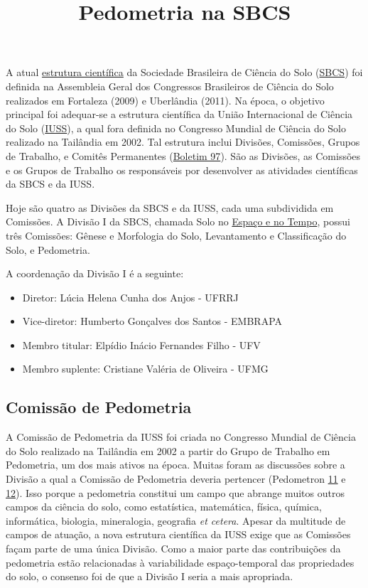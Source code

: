 \title{Pedometria na SBCS}
\maketitle

A atual \href{http://www.sbcs.org.br/a-sbcs/estatuto/}{estrutura científica} da Sociedade Brasileira de Ciência do Solo (\href{http://www.sbcs.org.br/}{SBCS}) foi definida na Assembleia Geral dos Congressos Brasileiros de Ciência do Solo realizados em Fortaleza (2009) e Uberlândia (2011). Na época, o objetivo principal foi adequar-se a estrutura científica da União Internacional de Ciência do Solo (\href{http://www.iuss.org/}{IUSS}), a qual fora definida no Congresso Mundial de Ciência do Solo realizado na Tailândia em 2002. Tal estrutura inclui Divisões, Comissões, Grupos de Trabalho, e Comitês Permanentes (\href{http://www.iuss.org/images/stories/IUSS\%20Bulletin\%201\%20-\%20117/00000097.pdf}{Boletim 97}). São as Divisões, as Comissões e os Grupos de Trabalho os responsáveis por desenvolver as atividades científicas da SBCS e da IUSS.

Hoje são quatro as Divisões da SBCS e da IUSS, cada uma subdividida em Comissões. A Divisão I da SBCS, chamada Solo no \href{http://www.sbcs.org.br/comissoes-especializadas/divisao-1-solo-no-espaco-e-no-tempo/}{Espaço e no Tempo}, possui três Comissões: Gênese e Morfologia do Solo, Levantamento e Classificação do Solo, e Pedometria.

A coordenação da Divisão I é a seguinte:

\begin{itemize}
 \item Diretor: Lúcia Helena Cunha dos Anjos - UFRRJ
 \item Vice-diretor: Humberto Gonçalves dos Santos - EMBRAPA
 \item Membro titular: Elpídio Inácio Fernandes Filho - UFV
\item Membro suplente: Cristiane Valéria de Oliveira - UFMG
\end{itemize}

\subsection{Comissão de Pedometria}

A Comissão de Pedometria da IUSS foi criada no Congresso Mundial de Ciência do Solo realizado na Tailândia em 2002 a partir do Grupo de Trabalho em Pedometria, um dos mais ativos na época. Muitas foram as discussões sobre a Divisão a qual a Comissão de Pedometria deveria pertencer (Pedometron \href{http://www.pedometrics.org/Pedometron/pedometron11.pdf}{11} e \href{http://www.pedometrics.org/Pedometron/pedometron12.pdf}{12}). Isso porque a pedometria constitui um campo que abrange muitos outros campos da ciência do solo, como estatística, matemática, física, química, informática, biologia, mineralogia, geografia \textit{et cetera}. Apesar da multitude de campos de atuação, a nova estrutura científica da IUSS exige que as Comissões façam parte de uma única Divisão. Como a maior parte das contribuições da pedometria estão relacionadas à variabilidade espaço-temporal das propriedades do solo, o consenso foi de que a Divisão I seria a mais apropriada.

